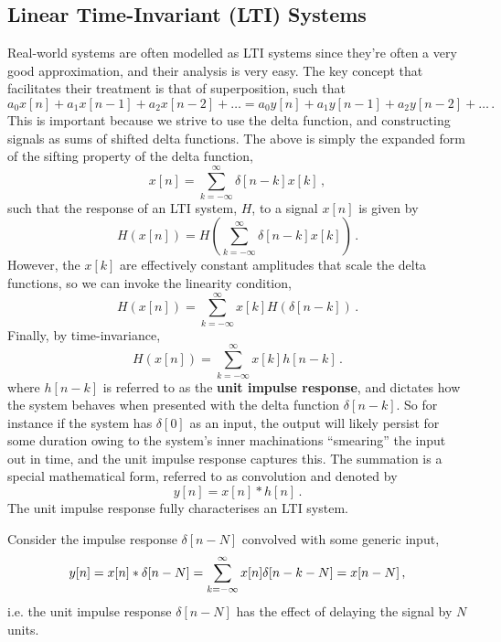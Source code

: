 \subsection{Linear Time-Invariant (LTI) Systems}
%
Real-world systems are often modelled as LTI systems since they're often a very good approximation,
and their analysis is very easy. The key concept that facilitates their treatment is that of
superposition, such that
%
\begin{equation}
  a_0x[n] + a_1x[n-1] + a_2x[n-2] + \hdots = a_0y[n] + a_1y[n-1] + a_2y[n-2] + \hdots \,.
\end{equation}
%
This is important because we strive to use the delta function, and constructing signals as
sums of shifted delta functions. The above is simply the expanded form of the sifting property
of the delta function,
%
\begin{displaymath}
  x[n] = \sum_{k=-\infty}^\infty \delta[n-k]x[k] \,,
\end{displaymath}
%
such that the response of an LTI system, $H$, to a signal $x[n]$ is given by
%
\begin{equation}
  H(x[n]) = H\left( \sum_{k=-\infty}^\infty \delta[n-k]x[k] \right) \,.
\end{equation}
%
However, the $x[k]$ are effectively constant amplitudes that scale the delta functions,
so we can invoke the linearity condition,
%
\begin{equation}
  H(x[n]) = \sum_{k=-\infty}^\infty x[k] H(\delta[n-k]) \,.
\end{equation}
%
Finally, by time-invariance,
%
\begin{equation}
  H(x[n]) = \sum_{k=-\infty}^\infty x[k] h[n-k] \,.
\end{equation}
%
where $h[n-k]$ is referred to as the \textbf{unit impulse response}, and dictates how
the system behaves when presented with the delta function $\delta[n-k]$. So for
instance if the system has $\delta[0]$ as an input, the output will likely persist
for some duration owing to the system's inner machinations ``smearing'' the input out
in time, and the unit impulse response captures this.
The summation is a special mathematical form, referred to as convolution and denoted by
%
\begin{equation}
  y[n] = x[n] * h[n] \,.
\end{equation}
%
The unit impulse response fully characterises an LTI system.
%
\begin{exmp}
  Consider the impulse response $\delta[n-N]$ convolved with some generic input,
  \begin{displaymath}
    y[n] = x[n] * \delta[n-N] = \sum_{k=-\infty}^\infty x[n]\delta[n-k-N] = x[n-N] \,,
  \end{displaymath}
  i.e. the unit impulse response $\delta[n-N]$ has the effect of delaying the
  signal by $N$ units.
\end{exmp}
